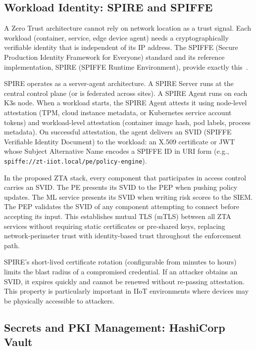 \documentclass[conference]{IEEEtran}
\begin{document}
\subsection{Workload Identity: SPIRE and SPIFFE}

A Zero Trust architecture cannot rely on network location as a trust signal. Each workload (container, service, edge device agent) needs a cryptographically verifiable identity that is independent of its IP address. The SPIFFE (Secure Production Identity Framework for Everyone) standard and its reference implementation, SPIRE (SPIFFE Runtime Environment), provide exactly this~\cite{spiffe2023}.

SPIRE operates as a server-agent architecture. A SPIRE Server runs at the central control plane (or is federated across sites). A SPIRE Agent runs on each K3s node. When a workload starts, the SPIRE Agent attests it using node-level attestation (TPM, cloud instance metadata, or Kubernetes service account tokens) and workload-level attestation (container image hash, pod labels, process metadata). On successful attestation, the agent delivers an SVID (SPIFFE Verifiable Identity Document) to the workload: an X.509 certificate or JWT whose Subject Alternative Name encodes a SPIFFE ID in URI form (e.g., \texttt{spiffe://zt-iiot.local/pe/policy-engine}).

In the proposed ZTA stack, every component that participates in access control carries an SVID. The PE presents its SVID to the PEP when pushing policy updates. The ML service presents its SVID when writing risk scores to the SIEM. The PEP validates the SVID of any component attempting to connect before accepting its input. This establishes mutual TLS (mTLS) between all ZTA services without requiring static certificates or pre-shared keys, replacing network-perimeter trust with identity-based trust throughout the enforcement path.

SPIRE's short-lived certificate rotation (configurable from minutes to hours) limits the blast radius of a compromised credential. If an attacker obtains an SVID, it expires quickly and cannot be renewed without re-passing attestation. This property is particularly important in IIoT environments where devices may be physically accessible to attackers.

\subsection{Secrets and PKI Management: HashiCorp Vault}
\end{document}
